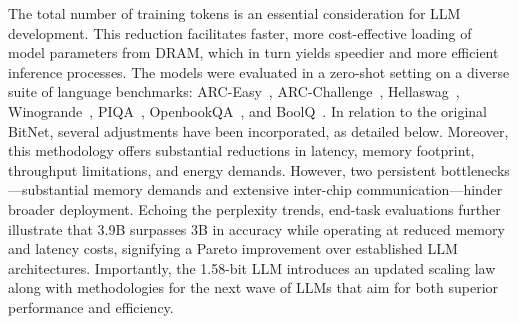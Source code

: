 The total number of training tokens is an essential consideration for LLM development. This reduction facilitates faster, more cost-effective loading of model parameters from DRAM, which in turn yields speedier and more efficient inference processes. The models were evaluated in a zero-shot setting on a diverse suite of language benchmarks: ARC-Easy~\cite{arc}, ARC-Challenge~\cite{arc}, Hellaswag~\cite{hellaswag}, Winogrande~\cite{winoGrande}, PIQA~\cite{piqa}, OpenbookQA~\cite{openbookqa}, and BoolQ~\cite{boolq}. In relation to the original BitNet, several adjustments have been incorporated, as detailed below. Moreover, this methodology offers substantial reductions in latency, memory footprint, throughput limitations, and energy demands. However, two persistent bottlenecks—substantial memory demands and extensive inter-chip communication—hinder broader deployment. Echoing the perplexity trends, end-task evaluations further illustrate that  3.9B surpasses  3B in accuracy while operating at reduced memory and latency costs, signifying a Pareto improvement over established LLM architectures. Importantly, the 1.58-bit LLM introduces an updated scaling law along with methodologies for the next wave of LLMs that aim for both superior performance and efficiency. 

